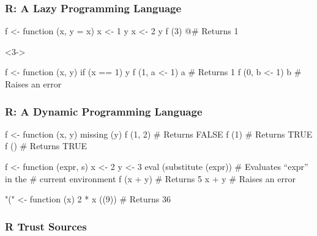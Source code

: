 \documentclass{beamer}
\begin{document}
\begin{frame}[fragile]
    \frametitle{R: A Lazy Programming Language}

\begin{Rcode}
f <- function (x, y = x) {
    x <- 1
    y
    x <- 2
    y
}
f (3)                               @\pause@# Returns 1
\end{Rcode}

\begin{overlayarea}{\textwidth}{3cm}
\begin{onlyenv}<3->
\begin{Rcode}
f <- function (x, y) if (x == 1) y
f (1, a <- 1)
a                                   # Returns 1
f (0, b <- 1)
b                                   # Raises an error
\end{Rcode}
\end{onlyenv}
\end{overlayarea}

\end{frame}

\begin{frame}[fragile]
    \frametitle{R: A Dynamic Programming Language}

\begin{Rcode}
f <- function (x, y) missing (y)
f (1, 2)                            # Returns FALSE
f (1)                               # Returns TRUE
f ()                                # Returns TRUE
\end{Rcode}

\pause

\begin{Rcode}
f <- function (expr, s) {
    x <- 2
    y <- 3
    eval (substitute (expr))        # Evaluates “expr” in the
                                    # current environment
  }
f (x + y)                           # Returns 5
x + y                               # Raises an error
\end{Rcode}

\pause

\begin{Rcode}
"(" <- function (x) 2 * x
((9))                               # Returns 36
\end{Rcode}

\end{frame}


\begin{frame}
    \frametitle{R Trust Sources}


\end{frame}
\end{document}
